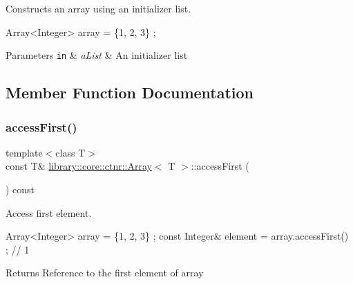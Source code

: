 Constructs an array using an initializer list. 


\begin{DoxyCode}
Array<Integer> array = \{1, 2, 3\} ;
\end{DoxyCode}



\begin{DoxyParams}[1]{Parameters}
\mbox{\tt in}  & {\em a\+List} & An initializer list \\
\hline
\end{DoxyParams}


\subsection{Member Function Documentation}
\mbox{\label{classlibrary_1_1core_1_1ctnr_1_1_array_afea012716d6cfffa2803606c0b244419}} 
\subsubsection{\texorpdfstring{access\+First()}{accessFirst()}\hspace{0.1cm}{\footnotesize\ttfamily [1/2]}}
{\footnotesize\ttfamily template$<$class T$>$ \\
const T\& \hyperlink{classlibrary_1_1core_1_1ctnr_1_1_array}{library\+::core\+::ctnr\+::\+Array}$<$ T $>$\+::access\+First (\begin{DoxyParamCaption}{ }\end{DoxyParamCaption}) const}



Access first element. 


\begin{DoxyCode}
Array<Integer> array = \{1, 2, 3\} ;
\textcolor{keyword}{const} Integer& element = array.accessFirst() ; \textcolor{comment}{// 1}
\end{DoxyCode}


\begin{DoxyReturn}{Returns}
Reference to the first element of array 
\end{DoxyReturn}
\mbox{\label{classlibrary_1_1core_1_1ctnr_1_1_array_abb2068e46720e8df057b5410ac8879d5}} 
